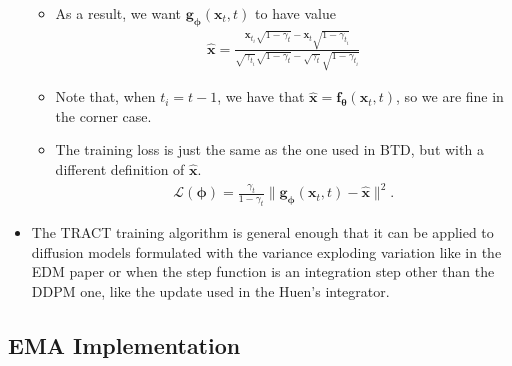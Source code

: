 \documentclass[10pt]{article}
\newcommand{\ve}[1]{\mathbf{#1}}
\newcommand{\ves}[1]{\boldsymbol{#1}}
\newcommand{\mcal}[1]{\mathcal{#1}}
\begin{document}
\begin{itemize}
\begin{itemize}
    \item As a result, we want $\ve{g}_{\ves{\phi}}(\ve{x}_t, t)$ to have value
    \begin{align*}
      \hat{\ve{x}} = \frac{\ve{x}_{t_i} \sqrt{1 - \gamma_t} - \ve{x}_t \sqrt{1 - \gamma_{t_i}}}{\sqrt{\gamma_{t_i}}\sqrt{1 - \gamma_t} - \sqrt{\gamma_t}\sqrt{1 - \gamma_{t_i}}}
    \end{align*}

    \item Note that, when $t_i = t-1$, we have that $\hat{\ve{x}} = \ve{f}_{\ves{\theta}}(\ve{x}_t, t)$, so we are fine in the corner case.
    
    \item The training loss is just the same as the one used in BTD, but with a different definition of $\hat{\ve{x}}$.
    \begin{align*}
      \mcal{L}(\ves{\phi}) = \frac{\gamma_t}{1 - \gamma_t} \| \ve{g}_{\ves{\phi}}(\ve{x}_t, t) - \hat{\ve{x}} \|^2.
    \end{align*}
  \end{itemize}

  \item The TRACT training algorithm is general enough that it can be applied to diffusion models formulated with the variance exploding variation like in the EDM paper \cite{Karras:2022} or when the step function is an integration step other than the DDPM one, like the update used in the Huen's integrator.
\end{itemize}

\subsection{EMA Implementation}
\end{document}
